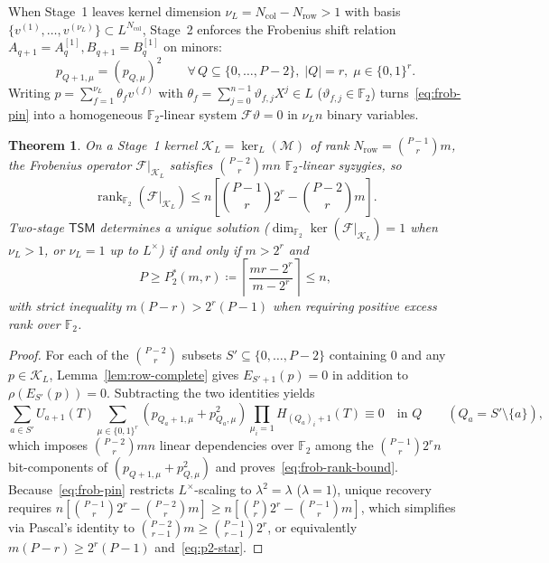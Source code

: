\documentclass[11pt,a4paper]{article}
\newtheorem{theorem}{Theorem}
\theoremstyle{definition}
\theoremstyle{remark}
\newcommand{\Ftwo}{\mathbb{F}_2}
\newcommand{\rk}{\operatorname{rank}}
\newcommand{\TSM}{\mathsf{TSM}}
\begin{document}
When Stage~1 leaves kernel dimension $\nu_L = N_{\text{col}} - N_{\text{row}} > 1$ with basis $\{v^{(1)}, \dots, v^{(\nu_L)}\} \subset L^{N_{\text{col}}}$, Stage~2 enforces the Frobenius shift relation $A_{q+1} = A_q^{[1]}, B_{q+1} = B_q^{[1]}$ on minors:
\begin{equation}
\label{eq:frob-pin}
    p_{Q+1, \mu} = (p_{Q, \mu})^2 \qquad \forall\, Q \subseteq \{0, \dots, P-2\},\; |Q| = r,\; \mu \in \{0,1\}^r.
\end{equation}
Writing $p = \sum_{f=1}^{\nu_L} \theta_f v^{(f)}$ with $\theta_f = \sum_{j=0}^{n-1} \vartheta_{f,j} X^j \in L$ ($\vartheta_{f,j} \in \Ftwo$) turns~\eqref{eq:frob-pin} into a homogeneous $\Ftwo$-linear system $\mathcal{F} \vartheta = 0$ in $\nu_L n$ binary variables.

\begin{theorem}
\label{thm:ct-threshold}
On a Stage~1 kernel $\mathcal{K}_L = \ker_L(\mathcal{M})$ of rank $N_{\text{row}} = \binom{P-1}{r}m$, the Frobenius operator $\mathcal{F}|_{\mathcal{K}_L}$ satisfies $\binom{P-2}{r} m n$ $\Ftwo$-linear syzygies, so
\begin{equation}
\label{eq:frob-rank-bound}
    \rk_{\Ftwo}\!\left(\mathcal{F}\big|_{\mathcal{K}_L}\right) \le n \left[ \binom{P-1}{r} 2^r - \binom{P-2}{r} m \right].
\end{equation}
Two-stage $\TSM$ determines a unique solution ($\dim_{\Ftwo} \ker(\mathcal{F}|_{\mathcal{K}_L}) = 1$ when $\nu_L > 1$, or $\nu_L = 1$ up to $L^\times$) if and only if $m > 2^r$ and
\begin{equation}
\label{eq:p2-star}
    P \ge P_2^*(m, r) \coloneqq \left\lceil \frac{m r - 2^r}{m - 2^r} \right\rceil \le n,
\end{equation}
with strict inequality $m(P - r) > 2^r(P - 1)$ when requiring positive excess rank over $\Ftwo$.
\end{theorem}

\begin{proof}
For each of the $\binom{P-2}{r}$ subsets $S' \subseteq \{0, \dots, P-2\}$ containing $0$ and any $p \in \mathcal{K}_L$, Lemma~\ref{lem:row-complete} gives $E_{S'+1}(p) = 0$ in addition to $\rho(E_{S'}(p)) = 0$. Subtracting the two identities yields
\[
    \sum_{a \in S'} U_{a+1}(T) \sum_{\mu \in \{0,1\}^r} (p_{Q_a+1,\mu} + p_{Q_a,\mu}^2) \prod_{\mu_i = 1} H_{(Q_a)_i + 1}(T) \equiv 0 \quad \text{in } Q \qquad (Q_a = S' \setminus \{a\}),
\]
which imposes $\binom{P-2}{r} m n$ linear dependencies over $\Ftwo$ among the $\binom{P-1}{r} 2^r n$ bit-components of $(p_{Q+1,\mu} + p_{Q,\mu}^2)$ and proves~\eqref{eq:frob-rank-bound}. Because~\eqref{eq:frob-pin} restricts $L^\times$-scaling to $\lambda^2 = \lambda$ ($\lambda = 1$), unique recovery requires $n[\binom{P-1}{r}2^r - \binom{P-2}{r}m] \ge n[\binom{P}{r}2^r - \binom{P-1}{r}m]$, which simplifies via Pascal's identity to $\binom{P-2}{r-1} m \ge \binom{P-1}{r-1} 2^r$, or equivalently $m(P - r) \ge 2^r(P - 1)$ and~\eqref{eq:p2-star}.
\end{proof}
\end{document}
